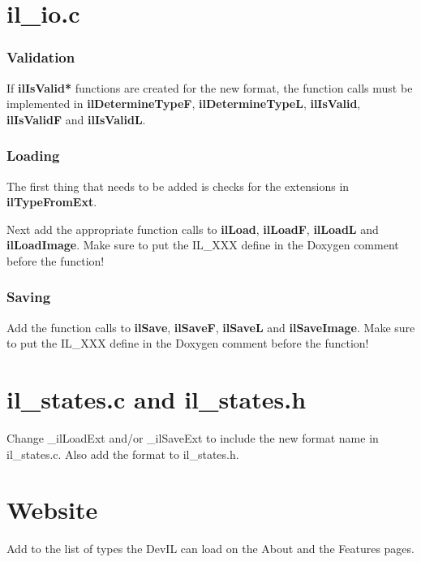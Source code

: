 \documentclass[letterpaper,10pt]{article}
\begin{document}
\section*{il\_io.c}

\subsubsection*{Validation}
If \textbf{ilIsValid*} functions are created for the new format, the function calls must be implemented in \textbf{ilDetermineTypeF}, \textbf{ilDetermineTypeL}, \textbf{ilIsValid}, \textbf{ilIsValidF} and \textbf{ilIsValidL}.

\subsubsection*{Loading}
The first thing that needs to be added is checks for the extensions in \textbf{ilTypeFromExt}.

Next add the appropriate function calls to \textbf{ilLoad}, \textbf{ilLoadF}, \textbf{ilLoadL} and \textbf{ilLoadImage}.  Make sure to put the IL\_XXX define in the Doxygen comment before the function!

\subsubsection*{Saving}
Add the function calls to \textbf{ilSave}, \textbf{ilSaveF}, \textbf{ilSaveL} and \textbf{ilSaveImage}.  Make sure to put the IL\_XXX define in the Doxygen comment before the function!


\section*{il\_states.c and il\_states.h}
Change \_ilLoadExt and/or \_ilSaveExt to include the new format name in il\_states.c.  Also add the format to il\_states.h.

\section*{Website}
Add to the list of types the DevIL can load on the About and the Features pages.
\end{document}
